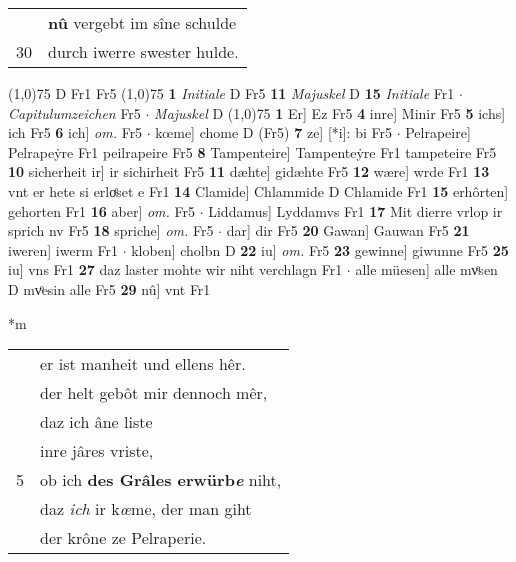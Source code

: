 \documentclass[8pt,a4paper,notitlepage]{article}
\begin{document}
\begin{table}[ht]
\begin{minipage}[t]{0.5\linewidth}
\begin{tabular}{rl}
 & \textbf{nû} vergebt im sîne schulde\\ 
30 & durch iwerre swester hulde.\\ 
\end{tabular}
\scriptsize
\line(1,0){75} \newline
D Fr1 Fr5 \newline
\line(1,0){75} \newline
\textbf{1} \textit{Initiale} D Fr5  \textbf{11} \textit{Majuskel} D  \textbf{15} \textit{Initiale} Fr1   $\cdot$ \textit{Capitulumzeichen} Fr5   $\cdot$ \textit{Majuskel} D  \newline
\line(1,0){75} \newline
\textbf{1} Er] Ez Fr5 \textbf{4} inre] Minir Fr5 \textbf{5} ichs] ich Fr5 \textbf{6} ich] \textit{om.} Fr5  $\cdot$ kœme] chome D (Fr5) \textbf{7} ze] [*i]: bi Fr5  $\cdot$ Pelrapeire] Pelrapeẏre Fr1 peilrapeire Fr5 \textbf{8} Tampenteire] Tampenteẏre Fr1 tampeteire Fr5 \textbf{10} sicherheit ir] ir sichirheit Fr5 \textbf{11} dæhte] gidæhte Fr5 \textbf{12} wære] wrde Fr1 \textbf{13} vnt er hete si erloͤset e Fr1 \textbf{14} Clamide] Chlammide D Chlamide Fr1 \textbf{15} erhôrten] gehorten Fr1 \textbf{16} aber] \textit{om.} Fr5  $\cdot$ Liddamus] Lyddamvs Fr1 \textbf{17} Mit dierre vrlop ir sprich nv Fr5 \textbf{18} spriche] \textit{om.} Fr5  $\cdot$ dar] dir Fr5 \textbf{20} Gawan] Gauwan Fr5 \textbf{21} iweren] iwerm Fr1  $\cdot$ kloben] cholbn D \textbf{22} iu] \textit{om.} Fr5 \textbf{23} gewinne] giwunne Fr5 \textbf{25} iu] vns Fr1 \textbf{27} daz laster mohte wir niht verchlagn Fr1  $\cdot$ alle müesen] alle mvͦsen D mvͦesin alle Fr5 \textbf{29} nû] vnt Fr1 \newline
\end{minipage}
\hspace{0.5cm}
\begin{minipage}[t]{0.5\linewidth}
\small
\begin{center}*m
\end{center}
\begin{tabular}{rl}
 & er ist manheit und ellens hêr.\\ 
 & der helt gebôt mir dennoch mêr,\\ 
 & daz ich âne liste\\ 
 & inre jâres vriste,\\ 
5 & ob ich \textbf{des Grâles erwürb\textit{e}} niht,\\ 
 & daz \textit{ich} ir k\textit{œ}me, der man giht\\ 
 & der krône ze Pelraperie.\\ 

\end{tabular}
\end{minipage}
\end{table}
\end{document}
